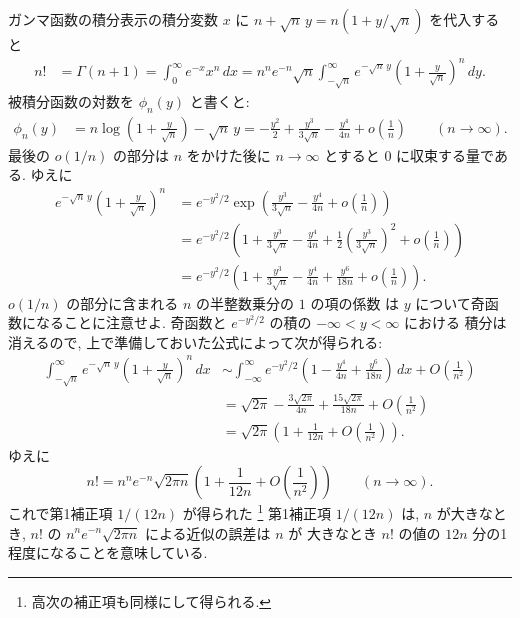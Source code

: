 \documentclass[12pt,twoside]{jarticle}
\theoremstyle{jplain}
\theoremstyle{jplain}
\theoremstyle{jplain}
\numberwithin{theorem}{section}
\numberwithin{equation}{section}
\numberwithin{figure}{section}
\numberwithin{table}{section}
\begin{document}
ガンマ函数の積分表示の積分変数 $x$ に $n+\sqrt{n}\,y=n(1+y/\sqrt{n})$ を代入すると
\begin{align*}
n!
&=\Gamma(n+1)
=\int_0^\infty e^{-x}x^n\,dx
=n^n e^{-n}\sqrt{n}
\int_{-\sqrt{n}}^\infty e^{-\sqrt{n}\,y} \left( 1+\frac{y}{\sqrt{n}} \right)^n \,dy.
\end{align*}
被積分函数の対数を $\phi_n(y)$ と書くと:
\begin{align*}
\phi_n(y)
&=n\log\left(1+\frac{y}{\sqrt{n}}\right)-\sqrt{n}\,y
=-\frac{y^2}{2} + \frac{y^3}{3\sqrt{n}}-\frac{y^4}{4n}+ o\left(\frac{1}{n}\right)
\qquad (n\to\infty).
\end{align*}
最後の $o(1/n)$ の部分は $n$ をかけた後に $n\to\infty$ とすると $0$ に収束する量である.
ゆえに
\begin{align*}
e^{-\sqrt{n}\,y} \left( 1+\frac{y}{\sqrt{n}} \right)^n
&=e^{-y^2/2}
\exp\left( \frac{y^3}{3\sqrt{n}}-\frac{y^4}{4n}+ o\left(\frac{1}{n}\right) \right)
\\ &
=e^{-y^2/2}
\left(
 1
 +\frac{y^3}{3\sqrt{n}}
 -\frac{y^4}{4n}
 +\frac{1}{2}\left( \frac{y^3}{3\sqrt{n}} \right)^2
 +o\left(\frac{1}{n}\right)
\right)
\\ &
=e^{-y^2/2}
\left(
1
+\frac{y^3}{3\sqrt{n}}
-\frac{y^4}{4n}
+\frac{y^6}{18n}
+o\left( \frac{1}{n} \right)
\right).
\end{align*}
$o(1/n)$ の部分に含まれる $n$ の半整数乗分の $1$ の項の係数
は $y$ について奇函数になることに注意せよ. 
奇函数と $e^{-y^2/2}$ の積の $-\infty<y<\infty$ における 
積分は消えるので, 上で準備しておいた公式によって次が得られる:
\begin{align*}
\int_{-\sqrt{n}}^\infty
e^{-\sqrt{n}\,y} \left( 1+\frac{y}{\sqrt{n}} \right)^n\,dx
& \sim
\int_{-\infty}^{\infty}
e^{-y^2/2}
\left(
 1
 -\frac{y^4}{4n}
 +\frac{y^6}{18n}
\right)
\,dx
+O\left( \frac{1}{n^2} \right)
\\ &
=
\sqrt{2\pi}
-\frac{3\sqrt{2\pi}}{4n}
+\frac{15\sqrt{2\pi}}{18n}
+O\left( \frac{1}{n^2} \right)
\\ &
=\sqrt{2\pi}\left(1 + \frac{1}{12n} + O\left(\frac{1}{n^2}\right) \right).
\end{align*}
ゆえに
\[
n! 
=
n^n e^{-n}\sqrt{2\pi n}
\left(1+\frac{1}{12n}+O\left(\frac{1}{n^2}\right)\right)
\qquad(n\to\infty).
\]
これで第1補正項 $1/(12n)$ が得られた%
\footnote{高次の補正項も同様にして得られる.}
第1補正項 $1/(12n)$ は, $n$ が大きなとき, 
$n!$ の $n^n e^{-n}\sqrt{2\pi n}$ による近似の誤差は $n$ が
大きなとき $n!$ の値の $12n$ 分の1程度になることを意味している.
\end{document}
